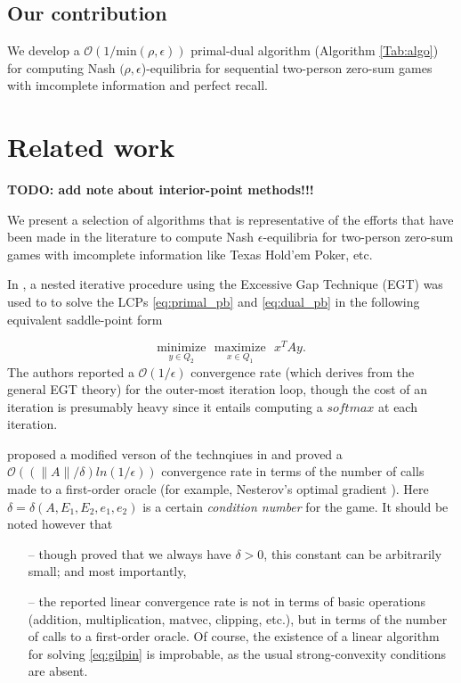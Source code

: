 \documentclass{article} %
\begin{document}
\subsection{Our contribution}
We develop a $\mathcal{O}(1/\text{min}(\rho,\epsilon))$ primal-dual
algorithm (Algorithm \ref{Tab:algo}) for computing Nash $(\rho,
  \epsilon$)-equilibria for sequential two-person zero-sum games with
  imcomplete information and perfect recall.

\section{Related work}
\label{sec:related_work}
\textbf{TODO: add note about interior-point methods!!!}

We present a selection of algorithms that is representative of the
efforts that have been made in the literature to compute Nash
$\epsilon$-equilibria for two-person zero-sum games with imcomplete
information like Texas Hold'em Poker, etc.


In \cite{hoda2010smoothing}, a nested iterative procedure using the
Excessive Gap Technique (EGT) \cite{nesterov2005excessive} was used to
to solve the LCPs \eqref{eq:primal_pb} and \eqref{eq:dual_pb} in the
following equivalent saddle-point form


\begin{equation}
  \underset{y \in Q_2}{\text{minimize}}\text{ }\underset{x \in
    Q_1}{\text{maximize}}\text{ }x^TAy.
  \label{eq:gilpin}
\end{equation}
The authors reported a $\mathcal{O}(1/\epsilon)$ convergence rate
(which derives from the general EGT theory) for the outer-most
iteration loop, though the cost of an iteration is presumably heavy
since it entails computing a $softmax$ at each iteration.


\cite{gilpinfirst} proposed a modified verson of the technqiues in
\cite{hoda2010smoothing} and  proved a $\mathcal{O}\left(\left(\|A\| /
\delta\right) ln\left(1 / \epsilon\right)\right)$ convergence rate in
terms of the number of calls made to a first-order oracle (for
example, Nesterov's optimal gradient \cite{nesterov1983}). Here
$\delta = \delta(A, E_1, E_2, e_1, e_2)$ is a certain
\textit{condition number} for the game. It should be noted however that
\begin{itemize}
\item[--] though \cite{gilpinfirst} proved that we always have $\delta
  > 0$, this constant can be arbitrarily small; and most importantly,
\item[--] the reported linear convergence rate is not in terms of
  basic operations (addition, multiplication, matvec, clipping, etc.),
  but in terms of the number of calls to a first-order oracle. Of
  course, the existence of a linear algorithm for solving
  \eqref{eq:gilpin} is improbable, as the usual strong-convexity
  conditions are absent.

\end{itemize}
\end{document}
